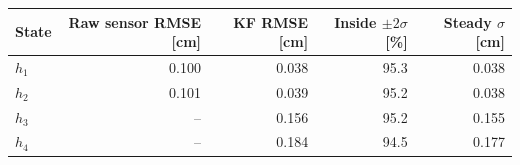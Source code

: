 \begin{tabular}{lrrrr}
\toprule
State & Raw sensor RMSE [cm] & KF RMSE [cm] & Inside $\pm2\sigma$ [\%] & Steady $\sigma$ [cm] \\
\midrule
$h_1$ & 0.100 & 0.038 & 95.3 & 0.038 \\
$h_2$ & 0.101 & 0.039 & 95.2 & 0.038 \\
$h_3$ & -- & 0.156 & 95.2 & 0.155 \\
$h_4$ & -- & 0.184 & 94.5 & 0.177 \\
\bottomrule
\end{tabular}
